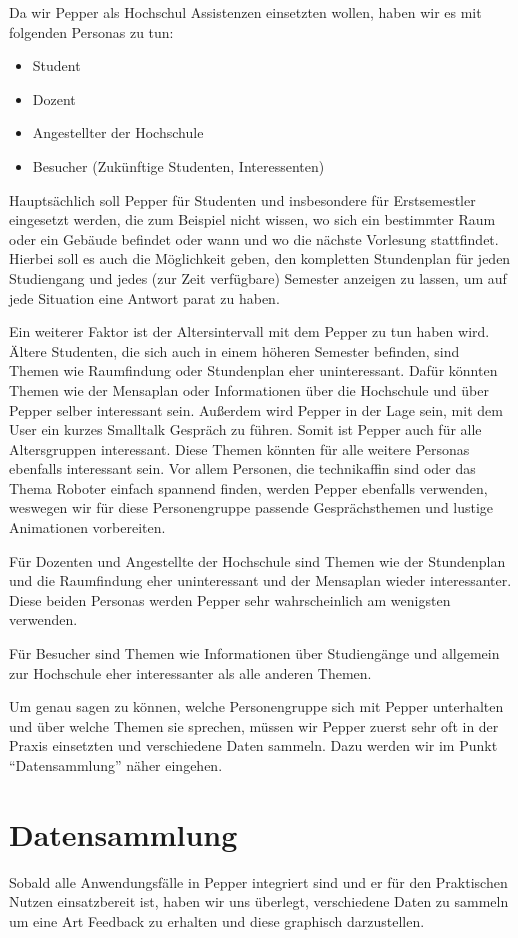 Da wir Pepper als Hochschul Assistenzen einsetzten wollen, haben wir es mit folgenden Personas zu tun:
\begin{itemize}
    \item Student
    \item Dozent
    \item Angestellter der Hochschule
    \item Besucher (Zukünftige Studenten, Interessenten)
\end{itemize}

Hauptsächlich soll Pepper für Studenten und insbesondere für Erstsemestler eingesetzt werden, die zum Beispiel nicht wissen, wo sich ein bestimmter Raum oder ein Gebäude befindet oder wann und wo die nächste Vorlesung stattfindet. Hierbei soll es auch die Möglichkeit geben, den kompletten Stundenplan für jeden Studiengang und jedes (zur Zeit verfügbare) Semester anzeigen zu lassen, um auf jede Situation eine Antwort parat zu haben.

Ein weiterer Faktor ist der Altersintervall mit dem Pepper zu tun haben wird. Ältere Studenten, die sich auch in einem höheren Semester befinden, sind Themen wie Raumfindung oder Stundenplan eher uninteressant. Dafür könnten Themen wie der Mensaplan oder Informationen über die Hochschule und über Pepper selber interessant sein. Außerdem wird Pepper in der Lage sein, mit dem User ein kurzes Smalltalk Gespräch zu führen. Somit ist Pepper auch für alle Altersgruppen interessant. Diese Themen könnten für alle weitere Personas ebenfalls interessant sein. Vor allem Personen, die technikaffin sind oder das Thema Roboter einfach spannend finden, werden Pepper ebenfalls verwenden, weswegen wir für diese Personengruppe passende Gesprächsthemen und lustige Animationen vorbereiten.

Für Dozenten und Angestellte der Hochschule sind Themen wie der Stundenplan und die Raumfindung eher uninteressant und der Mensaplan wieder interessanter. Diese beiden Personas werden Pepper sehr wahrscheinlich am wenigsten verwenden.

Für Besucher sind Themen wie Informationen über Studiengänge und allgemein zur Hochschule eher interessanter als alle anderen Themen.

Um genau sagen zu können, welche Personengruppe sich mit Pepper unterhalten und über welche Themen sie sprechen, müssen wir Pepper zuerst sehr oft in der Praxis einsetzten und verschiedene Daten sammeln. Dazu werden wir im Punkt “Datensammlung” näher eingehen.


\section{Datensammlung}
Sobald alle Anwendungsfälle in Pepper integriert sind und er für den Praktischen Nutzen einsatzbereit ist, haben wir uns überlegt, verschiedene Daten zu sammeln um eine Art Feedback zu erhalten und diese graphisch darzustellen.

